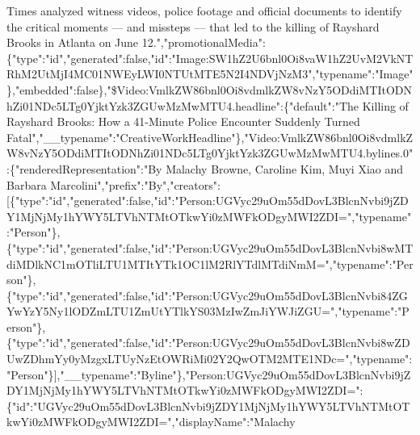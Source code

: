 Times analyzed witness videos, police footage and official documents to
identify the critical moments --- and missteps --- that led to the
killing of Rayshard Brooks in Atlanta on June
12.","promotionalMedia":\{"type":"id","generated":false,"id":"Image:SW1hZ2U6bnl0Oi8vaW1hZ2UvM2VkNTRhM2UtMjI4MC01NWEyLWI0NTUtMTE5N2I4NDVjNzM3","typename":"Image"\},"embedded":false\},"\$Video:VmlkZW86bnl0Oi8vdmlkZW8vNzY5ODdiMTItODNhZi01NDc5LTg0YjktYzk3ZGUwMzMwMTU4.headline":\{"default":"The
Killing of Rayshard Brooks: How a 41-Minute Police Encounter Suddenly
Turned
Fatal","\_\_typename":"CreativeWorkHeadline"\},"Video:VmlkZW86bnl0Oi8vdmlkZW8vNzY5ODdiMTItODNhZi01NDc5LTg0YjktYzk3ZGUwMzMwMTU4.bylines.0":\{"renderedRepresentation":"By
Malachy Browne, Caroline Kim, Muyi Xiao and Barbara
Marcolini","prefix":"By","creators":{[}\{"type":"id","generated":false,"id":"Person:UGVyc29uOm55dDovL3BlcnNvbi9jZDY1MjNjMy1hYWY5LTVhNTMtOTkwYi0zMWFkODgyMWI2ZDI=","typename":"Person"\},\{"type":"id","generated":false,"id":"Person:UGVyc29uOm55dDovL3BlcnNvbi8wMTdiMDlkNC1mOTliLTU1MTItYTk1OC1lM2RlYTdlMTdiNmM=","typename":"Person"\},\{"type":"id","generated":false,"id":"Person:UGVyc29uOm55dDovL3BlcnNvbi84ZGYwYzY5Ny1lODZmLTU1ZmUtYTlkYS03MzIwZmJiYWJiZGU=","typename":"Person"\},\{"type":"id","generated":false,"id":"Person:UGVyc29uOm55dDovL3BlcnNvbi8wZDUwZDhmYy0yMzgxLTUyNzEtOWRiMi02Y2QwOTM2MTE1NDc=","typename":"Person"\}{]},"\_\_typename":"Byline"\},"Person:UGVyc29uOm55dDovL3BlcnNvbi9jZDY1MjNjMy1hYWY5LTVhNTMtOTkwYi0zMWFkODgyMWI2ZDI=":\{"id":"UGVyc29uOm55dDovL3BlcnNvbi9jZDY1MjNjMy1hYWY5LTVhNTMtOTkwYi0zMWFkODgyMWI2ZDI=","displayName":"Malachy

